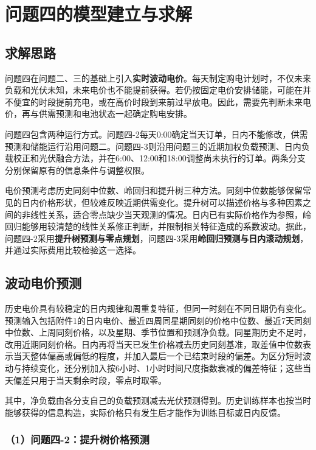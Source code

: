 \section{问题四的模型建立与求解}

\subsection{求解思路}

问题四在问题二、三的基础上引入\textbf{实时波动电价}。每天制定购电计划时，不仅未来负载和光伏未知，未来电价也不能提前获得。若仍按固定电价安排储能，可能在并不便宜的时段提前充电，或在高价时段到来前过早放电。因此，需要先判断未来电价，再与供需预测和电池状态一起确定购电安排。

问题四包含两种运行方式。问题四-2每天0:00确定当天订单，日内不能修改，供需预测和储能运行沿用问题二。问题四-3则沿用问题三的近期加权负载预测、日内负载校正和光伏融合方法，并在6:00、12:00和18:00调整尚未执行的订单。两条分支分别保留原有的信息条件与调整权限。

电价预测考虑历史同刻中位数、岭回归和提升树三种方法。同刻中位数能够保留常见的日内价格形状，但较难反映近期供需变化。提升树可以描述价格与多种因素之间的非线性关系，适合零点缺少当天观测的情况。日内已有实际价格作为参照，岭回归能够用较清楚的线性关系修正判断，并限制相关特征造成的系数波动。据此，问题四-2采用\textbf{提升树预测与零点规划}，问题四-3采用\textbf{岭回归预测与日内滚动规划}，并通过实际费用比较检验这一选择。

\subsection{波动电价预测}

历史电价具有较稳定的日内规律和周重复特征，但同一时刻在不同日期仍有变化。预测输入包括附件1的日内电价、最近四周同星期同刻的价格中位数、最近7天同刻中位数、上周同刻价格，以及星期、季节位置和预测净负载。同星期历史不足时，改用近期同刻价格。日内再将当天已发生价格减去历史同刻基准，取差值中位数表示当天整体偏高或偏低的程度，并加入最后一个已结束时段的偏差。为区分短时波动与持续变化，还分别加入按6小时、1小时时间尺度指数衰减的偏差特征；这些当天偏差只用于当天剩余时段，零点时取零。

其中，净负载由各分支自己的负载预测减去光伏预测得到。历史训练样本也按当时能够获得的信息构造，实际价格只有发生后才能作为训练目标或日内反馈。

\subsubsection*{（1）问题四-2：提升树价格预测}

